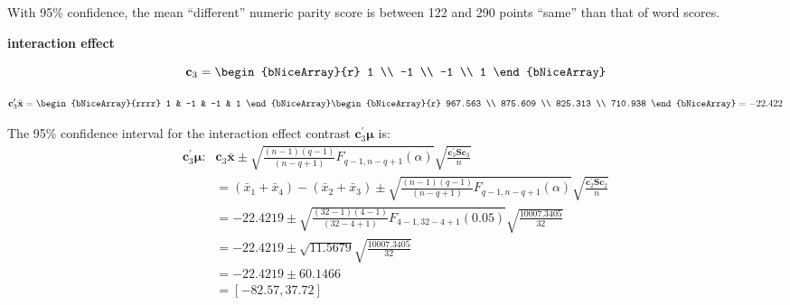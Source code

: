 \begin{enumerate}[label= (\alph*)]
    With 95\% confidence, the mean ``different'' numeric parity score is between 122 and 290 points ``same'' than that of word scores.

    \textbf{interaction effect}

    \[
        \textbf{c}_{3}
        =
        \begin{bNiceArray}{r}
             1 \\
            -1 \\
            -1 \\
             1
        \end{bNiceArray}
    \]

    \[
        \textbf{c}_{3}^{\prime} 
        \bar{\textbf{x}}
        =
        \begin{bNiceArray}{rrrr}
            1 & -1 & -1 & 1
        \end{bNiceArray}
        \begin{bNiceArray}{r}
            967.563 \\
            875.609 \\
            825.313 \\
            710.938
        \end{bNiceArray}
        =
        -22.422
    \]
 
    The 95\% confidence interval for the interaction effect contrast 
    $\textbf{c}_{3}^{\prime}\bm{\mu}$ is:
    \begin{align*}
         \textbf{c}_{3}^{\prime}\bm{\mu}\text{:}
         &
        \textbf{c}_{3}\bar{\textbf{x}}
        \pm
        \sqrt{
            \frac{(n-1)(q-1)}{(n-q+1)}
            F_{q-1, n-q+1}\left(\alpha\right)
        }
        \sqrt{
            \frac{\textbf{c}_{3}^{\prime}\textbf{S}\textbf{c}_{3}}{n}
        }
        \\
        & =
        \left(\bar{x}_{1} + \bar{x}_{4}\right)
        -
        \left(\bar{x}_{2} + \bar{x}_{3}\right)
        \pm
        \sqrt{
            \frac{(n-1)(q-1)}{(n-q+1)}
            F_{q-1, n-q+1}\left(\alpha\right)
        }
        \sqrt{
            \frac{\textbf{c}_{2}^{\prime}\textbf{S}\textbf{c}_{2}}{n}
        }
        \\
        & =
        -22.4219
        \pm
        \sqrt{
            \frac{(32-1)(4-1)}{(32-4+1)}
            F_{4-1, 32-4+1}(0.05)
        }
        \sqrt{
            \frac{10007.3405}{32}
        }
        \\
        & =
        -22.4219
        \pm
        \sqrt{11.5679}
        \sqrt{
            \frac{10007.3405}{32}
        }
        \\
        & =
        -22.4219
        \pm
        60.1466
        \\
        & =
        \left[-82.57, 37.72\right]
    \end{align*}
   

\end{enumerate}

